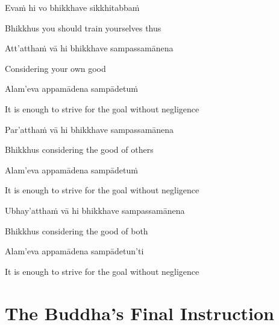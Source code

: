 Evaṁ hi vo bhikkhave sikkhitabbaṁ

\begin{english}
  Bhikkhus you should train yourselves thus
\end{english}

Att'atthaṁ vā hi bhikkhave sampassamānena

\begin{english}
  Considering your own good
\end{english}

Alam'eva appamādena sampādetuṁ

\begin{english}
  It is enough to strive for the goal without negligence
\end{english}

Par'atthaṁ vā hi bhikkhave sampassamānena

\begin{english}
  Bhikkhus considering the good of others
\end{english}

Alam'eva appamādena sampādetuṁ

\begin{english}
  It is enough to strive for the goal without negligence
\end{english}

Ubhay'atthaṁ vā hi bhikkhave sampassamānena

\begin{english}
  Bhikkhus considering the good of both
\end{english}

Alam'eva appamādena sampādetun'ti\ifdigital\makeatletter\hyperlink{endnote93-appendix}\makeatother\fi

\begin{english}
  It is enough to strive for the goal without negligence
\end{english}

\suttaRef{[SN 12.22]}

\ifdigital{}\fi



\section{The Buddha's Final Instruction}
\label{buddhas-final-instruction}

